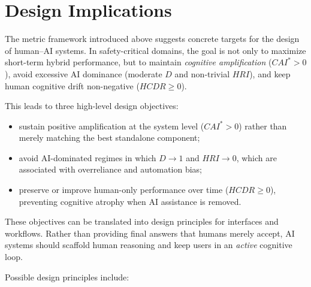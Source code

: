 \documentclass[11pt]{article}
\begin{document}
\section{Design Implications}

The metric framework introduced above suggests concrete targets
for the design of human--AI systems.
In safety-critical domains, the goal is not only to maximize
short-term hybrid performance, but to maintain
\emph{cognitive amplification} ($CAI^* > 0$),
avoid excessive AI dominance (moderate $D$ and non-trivial $HRI$),
and keep human cognitive drift non-negative ($HCDR \ge 0$).

This leads to three high-level design objectives:

\begin{itemize}
\item sustain positive amplification at the system level
      ($CAI^* > 0$) rather than merely matching the best
      standalone component;
\item avoid AI-dominated regimes in which $D \to 1$ and $HRI \to 0$,
      which are associated with overreliance and automation bias;
\item preserve or improve human-only performance over time
      ($HCDR \ge 0$), preventing cognitive atrophy when AI
      assistance is removed.\cite{cognitive-offloading,designing-ai-expertise}
\end{itemize}

These objectives can be translated into design principles for
interfaces and workflows.
Rather than providing final answers that humans merely accept,
AI systems should scaffold human reasoning and keep users in an
\emph{active} cognitive loop.

Possible design principles include:
\end{document}
